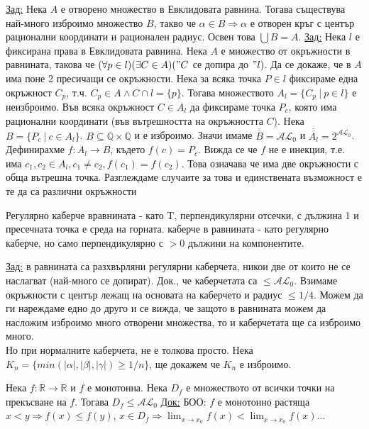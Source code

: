 \documentclass[fleqn, titlepage, 12pt]{report}
\begin{document}
\underline{Зад:} Нека $ A $ е отворено множество в Евклидовата равнина. Тогава съществува най-много изброимо множество
$ B $, такво че $ \alpha \in B \Rightarrow \alpha  $ е отворен кръг с център рационални координати и рационален радиус.
Освен това $ \bigcup B = A $.
\bigbreak
\underline{Зад:} Нека $ l $ е фиксирана права в Евклидовата равнина. Нека $ A $ е множество от окръжности в равнината,
такова че $ (\forall{p \in l})(\exists{C \in A})("C$ се допира до $"l) $. Да се докаже, че в $ A $ има поне 2 пресичащи
се окръжности.
\bigbreak
Нека за всяка точка $ P \in l $ фиксираме една окръжност $ C_p $, т.ч. $ C_p \in A \land C \cap l = \{ p \} $.
Тогава множеството $ A_l = \{C_p\ |\ p \in l\} $ е неизброимо. Във всяка окръжност $ C \in A_l$ да фиксираме точка
$ P_c $, която има рационални координати (във вътрешността на окръжността $ C $). Нека $ B = \{P_c\ |\ c \in A_l\} $.
$ B \subseteq \mathbb{Q} \times \mathbb{Q} $ и е изброимо. Значи имаме $ \overline{\overline{B}} = \mathcal{AL}_0 $ и
$ \overline{\overline{A_l}} = 2^{\mathcal{AL}_0} $. Дефинирахме $ f : A_l \rightarrow B $, където $ f(c) = P_c $.
Вижда се че $ f $ не е инекция, т.е. има $ c_1,c_2 \in A_l, c_1 \neq c_2 , f(c_1) = f(c_2)$. Това означава че има
две окръжности с обща вътрешна точка. Разглеждаме случаите за това и единствената възможност е те да са различни
окръжности
\bigbreak

 Регулярно каберче вравнината - като T, перпендикулярни отсечки,
с дължина 1 и пресечната точка е среда на горната.
\bigbreak
{} каберче в равнината  - като регулярно каберче, но само перпендикулярно с $ > 0 $ дължини на компонентите.
\bigbreak

\underline{Зад:} в равнината са разхвърляни регулярни каберчета, никои две от които не се наслагват
(най-много се допират). Док., че каберчетата са $ \leq \mathcal{AL}_0 $.
\bigbreak
Взимаме окръжности с център лежащ на основата на каберчето и радиус $ \leq 1/4 $. Можем да ги нареждаме едно до друго и се вижда, че защото в равнината можем да
насложим изброимо много отворени множества, то и каберчетата ще са изброимо много.\\
Но при нормалните каберчета, не е толкова просто. Нека $ K_n = \{ min(|\alpha|, |\beta|, |\gamma|) \geq 1/n\} $,
ще докажем че $ K_n $ е изброимо.
\bigbreak

 Нека $ f : \mathbb{R} \rightarrow \mathbb{R} $ и $ f $ е монотонна. Нека $ D_f $ е множеството от всички точки
на прекъсване на $ f $. Тогава $ D_f \leq \mathcal{AL}_0$
\bigbreak
\underline{Док:} БОО: $ f $ е монотонно растяща $ x < y \Rightarrow f(x) \leq f(y) $,
$ x \in D_f \Rightarrow \lim_{x \to x_0} f(x) < \lim_{x \to x_0} f(x)$...
\end{document}
